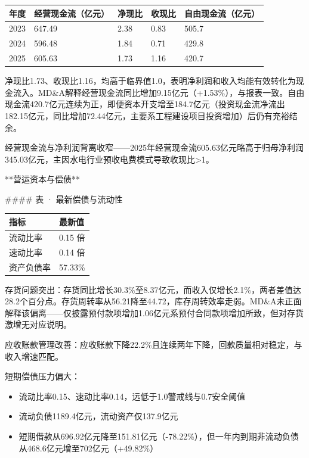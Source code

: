 \documentclass[12pt,a4paper]{article}
\begin{document}
\begin{table}[htbp]
\centering
\begin{tabular}{lllll}
\toprule
年度 & 经营现金流（亿元） & 净现比 & 收现比 & 自由现金流（亿元） \\
\midrule
2023 & 647.49 & 2.38 & 0.83 & 505.7 \\
2024 & 596.48 & 1.84 & 0.71 & 429.8 \\
2025 & 605.63 & 1.73 & 1.16 & 420.7 \\
\bottomrule
\end{tabular}
\end{table}


净现比1.73、收现比1.16，均高于临界值1.0，表明净利润和收入均能有效转化为现金流入。MD\&A解释经营现金流同比增加9.15亿元（+1.53\%），与报表一致。自由现金流420.7亿元连续为正，即便资本开支增至184.7亿元（投资现金流净流出182.15亿元，同比增加72.44亿元，主要系工程建设项目投资增加）后仍有充裕结余。

经营现金流与净利润背离收窄——2025年经营现金流605.63亿元略高于归母净利润345.03亿元，主因水电行业预收电费模式导致收现比>1。

**营运资本与偿债**

\#\#\#\# 表 · 最新偿债与流动性

\begin{table}[htbp]
\centering
\begin{tabular}{ll}
\toprule
指标 & 最新值 \\
\midrule
流动比率 & 0.15 倍 \\
速动比率 & 0.14 倍 \\
资产负债率 & 57.33\% \\
\bottomrule
\end{tabular}
\end{table}


存货问题突出：存货同比增长30.3\%至8.37亿元，而收入仅增长2.1\%，两者差值达28.2个百分点。存货周转率从56.21降至44.72，库存周转效率走弱。MD\&A未正面解释该偏离——仅披露预付款项增加1.06亿元系预付合同款项增加所致，但对存货激增无对应说明。

应收账款管理改善：应收账款下降22.2\%且连续两年下降，回款质量相对稳定，与收入增速匹配。

短期偿债压力偏大：

\begin{itemize}
\item 流动比率0.15、速动比率0.14，远低于1.0警戒线与0.7安全阈值
\item 流动负债1189.4亿元，流动资产仅137.9亿元
\item 短期借款从696.92亿元降至151.81亿元（-78.22\%），但一年内到期非流动负债从468.6亿元增至702亿元（+49.82\%）
\end{itemize}
\end{document}
